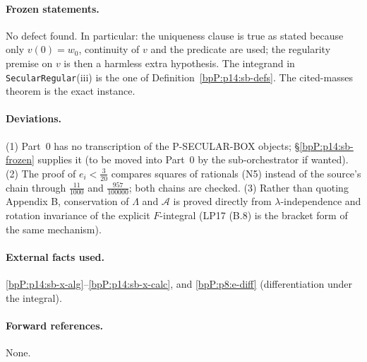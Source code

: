 \paragraph{Frozen statements.} No defect found. In particular: the uniqueness clause is true as stated because only $v(0)=w_0$, continuity of $v$ and the predicate are used; the regularity premise on $v$ is then a harmless extra hypothesis. The integrand in \texttt{SecularRegular}(iii) is the one of Definition~\ref{bpP:p14:sb-defs}. The cited-masses theorem is the exact instance.

\paragraph{Deviations.} (1) Part~0 has no transcription of the P-SECULAR-BOX objects; \S\ref{bpP:p14:sb-frozen} supplies it (to be moved into Part~0 by the sub-orchestrator if wanted). (2) The proof of $e_i<\frac3{20}$ compares squares of rationals (N5) instead of the source's chain through $\frac{11}{1000}$ and $\frac{957}{100000}$; both chains are checked. (3) Rather than quoting Appendix B, conservation of $\Lambda$ and $\mathcal A$ is proved directly from $\lambda$-independence and rotation invariance of the explicit $F$-integral (LP17 (B.8) is the bracket form of the same mechanism).

\paragraph{External facts used.} \ref{bpP:p14:sb-x-alg}--\ref{bpP:p14:sb-x-calc}, and \ref{bpP:p8:e-diff} (differentiation under the integral).

\paragraph{Forward references.} None.
\endgroup
